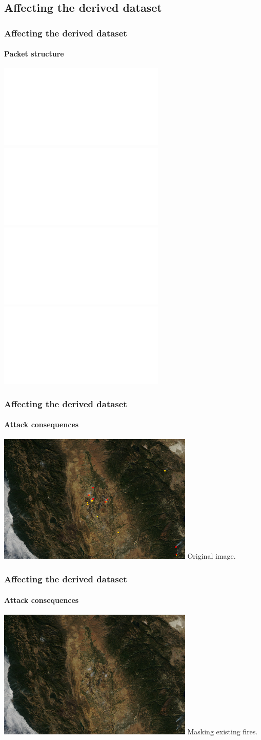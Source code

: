 \documentclass[aspectratio=169]{beamer}
\begin{document}
\subsection{Affecting the derived dataset}

\begin{frame}
  \frametitle{Affecting the derived dataset}
  \framesubtitle{Packet structure}
  \includegraphics<1|handout:0>[width=\textwidth]{images/packet_image_1.pdf}%
  \includegraphics<2|handout:0>[width=\textwidth]{images/packet_image_2.pdf}%
  \includegraphics<3|handout:0>[width=\textwidth]{images/packet_image_3.pdf}%
  \includegraphics<4>[width=\textwidth]{images/packet_image_4.pdf}%
\end{frame}

\begin{frame}
  \frametitle{Affecting the derived dataset}
  \framesubtitle{Attack consequences}
  \includegraphics[width=0.7\textwidth]{images/injection/original.jpg}
  \newline
  \centering
  Original image.
\end{frame}

\begin{frame}
  \frametitle{Affecting the derived dataset}
  \framesubtitle{Attack consequences}
  \includegraphics[width=0.7\textwidth]{images/injection/masked_0.jpg}
  \newline
  \centering
  Masking existing fires.
\end{frame}
\end{document}
